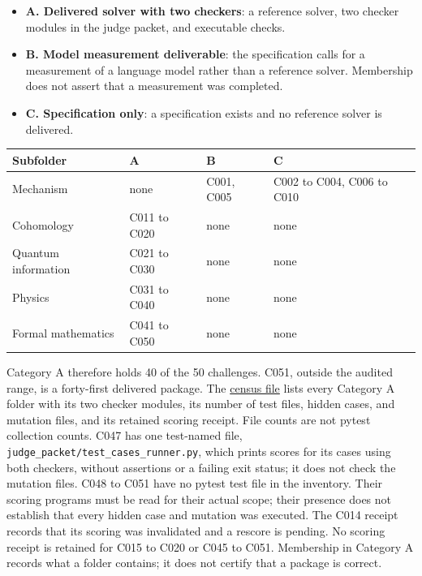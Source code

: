 \documentclass[
  11pt,
]{article}
\providecommand{\tightlist}{%
  \setlength{\itemsep}{0pt}\setlength{\parskip}{0pt}}
\begin{document}
\begin{itemize}
\tightlist
\item
  \textbf{A. Delivered solver with two checkers}: a reference solver,
  two checker modules in the judge packet, and executable checks.
\item
  \textbf{B. Model measurement deliverable}: the specification calls for
  a measurement of a language model rather than a reference solver.
  Membership does not assert that a measurement was completed.
\item
  \textbf{C. Specification only}: a specification exists and no
  reference solver is delivered.
\end{itemize}

\begin{longtable}[]{@{}llll@{}}
\toprule\noalign{}
Subfolder & A & B & C \\
\midrule\noalign{}
\endhead
\bottomrule\noalign{}
\endlastfoot
Mechanism & none & C001, C005 & C002 to C004, C006 to C010 \\
Cohomology & C011 to C020 & none & none \\
Quantum information & C021 to C030 & none & none \\
Physics & C031 to C040 & none & none \\
Formal mathematics & C041 to C050 & none & none \\
\end{longtable}

Category A therefore holds 40 of the 50 challenges. C051, outside the
audited range, is a forty-first delivered package. The
\href{../../008_pfp_mssn_tower_challenges_and_retraction_benchmarks/docs/challenge_census.md}{census
file} lists every Category A folder with its two checker modules, its
number of test files, hidden cases, and mutation files, and its retained
scoring receipt. File counts are not pytest collection counts. C047 has
one test-named file, \nolinkurl{judge_packet/test_cases_runner.py},
which prints scores for its cases using both checkers, without
assertions or a failing exit status; it does not check the mutation
files. C048 to C051 have no pytest test file in the inventory. Their
scoring programs must be read for their actual scope; their presence
does not establish that every hidden case and mutation was executed. The
C014 receipt records that its scoring was invalidated and a rescore is
pending. No scoring receipt is retained for C015 to C020 or C045 to
C051. Membership in Category A records what a folder contains; it does
not certify that a package is correct.
\end{document}
